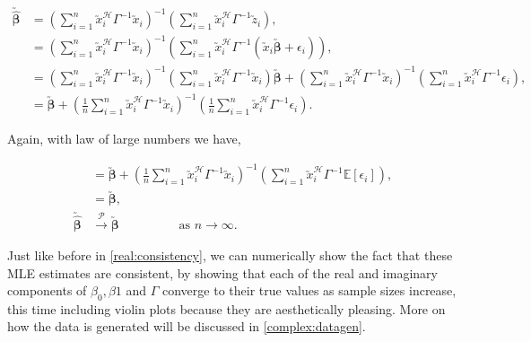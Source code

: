 \documentclass[honours,12pt]{unswthesis}
\newcommand{\E}{\mathbb{E}}
\newcommand{\ct}{\mathcal{H}}
\numberwithin{equation}{section}
\begin{document}
\begin{align*}
	\utilde{\widehat{\bm{\beta}}} &= \left( \sum_{i = 1}^{n} \utilde{x}_{i}^{\ct} \Gamma^{-1} \utilde{x}_{i} \right)^{-1} \left( \sum_{i = 1}^{n} \utilde{x}_{i}^{\ct} \Gamma^{-1} \utilde{z}_{i} \right),\\
	&= \left( \sum_{i = 1}^{n} \utilde{x}_{i}^{\ct} \Gamma^{-1} \utilde{x}_{i} \right)^{-1} \left( \sum_{i = 1}^{n} \utilde{x}_{i}^{\ct} \Gamma^{-1} \left( \utilde{x}_{i} \utilde{\bm{\beta}} + \epsilon_{i} \right) \right),\\
	&= \left( \sum_{i = 1}^{n} \utilde{x}_{i}^{\ct} \Gamma^{-1} \utilde{x}_{i} \right)^{-1} \left( \sum_{i = 1}^{n} \utilde{x}_{i}^{\ct} \Gamma^{-1} \utilde{x}_{i} \right) \utilde{\bm{\beta}} +  \left( \sum_{i = 1}^{n} \utilde{x}_{i}^{\ct} \Gamma^{-1} \utilde{x}_{i} \right)^{-1} \left( \sum_{i = 1}^{n} \utilde{x}_{i}^{\ct} \Gamma^{-1} \epsilon_{i} \right),\\
	&= \utilde{\bm{\beta}} +  \left( \frac{1}{n}\sum_{i = 1}^{n} \utilde{x}_{i}^{\ct} \Gamma^{-1} \utilde{x}_{i} \right)^{-1} \left( \frac{1}{n}\sum_{i = 1}^{n} \utilde{x}_{i}^{\ct} \Gamma^{-1} \epsilon_{i} \right).
\end{align*}

\noindent Again, with law of large numbers we have,

\begin{align*}
&= \utilde{\bm{\beta}} +  \left( \frac{1}{n}\sum_{i = 1}^{n} \utilde{x}_{i}^{\ct} \Gamma^{-1} \utilde{x}_{i} \right)^{-1} \left( \sum_{i = 1}^{n} \utilde{x}_{i}^{\ct} \Gamma^{-1}\E \left[ \epsilon_{i} \right] \right),\\
&= \utilde{\bm{\beta}},\\
\utilde{\widehat{\bm{\beta}}} &\xrightarrow{\mathcal{P}} \utilde{\bm{\beta}} \hspace{2cm} \text{as } n \xrightarrow{} \infty.
\end{align*}

Just like before in \ref{real:consistency}, we can numerically show the fact that these MLE estimates are consistent, by showing that each of the real and imaginary components of $\beta_{0}, \beta{1}$ and $\Gamma$ converge to their true values as sample sizes increase, this time including violin plots because they are aesthetically pleasing. More on how the data is generated will be discussed in \ref{complex:datagen}.
\end{document}
